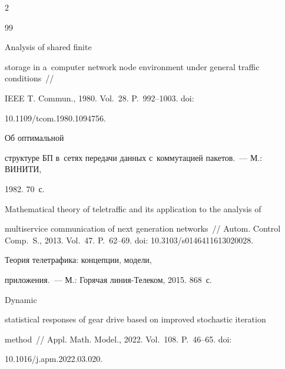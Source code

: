 \begin{multicols}{2}
{{\begin{thebibliography}{99}


 Analysis of shared finite 


storage in a~computer network node environment under general traffic conditions~// 


IEEE T. Commun., 1980. Vol.~28. P.~992--1003. doi: 


10.1109/tcom.1980.1094756.







 Об оптимальной 


структуре БП в~сетях передачи данных с~коммутацией пакетов.~--- М.: ВИНИТИ, 


1982. 70~с.












Mathematical theory of teletraffic and its application to the analysis of 


multiservice communication of next generation networks~// Autom. Control Comp.~S., 2013. Vol.~47. P.~62--69. doi: 10.3103/s0146411613020028.



















 Теория телетрафика: концепции, модели, 


приложения.~--- М.: Горячая лин\-ия-Телеком, 2015. 868~с.







 Dynamic 


statistical responses of gear drive based on improved stochastic iteration 


method~// Appl. Math. Model., 2022. Vol.~108. P.~46--65. doi: 


10.1016/j.apm.2022.03.020.






\end{thebibliography}}}
\end{multicols}
